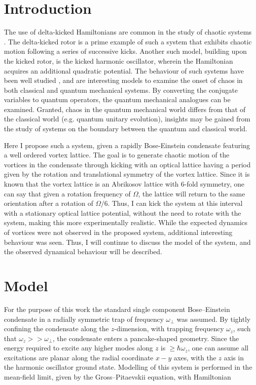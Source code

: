 \section{Introduction}

The use of delta-kicked Hamiltonians are common in the study of chaotic systems \cite{CT:Ullah_epjd_2012,CT:White_njp_2014}. The delta-kicked rotor is a prime example of such a system that exhibits chaotic motion following a series of successive kicks. Another such model, building upon the kicked rotor, is the kicked harmonic oscillator, wherein the Hamiltonian acquires an additional quadratic potential. The behaviour of such systems have been well studied \cite{CT:Berman_nonlin_1991, CT:Duffy_pra_2004}, and are interesting models to examine the onset of chaos in both classical and quantum mechanical systems. By converting the conjugate variables to quantum operators, the quantum mechanical analogues can be examined. Granted, chaos in the quantum mechanical world differs from that of the classical world (e.g. quantum unitary evolution), insights may be gained from the study of systems on the boundary between the quantum and classical world.

Here I propose such a system, given a rapidly Bose-Einstein condensate featuring a well ordered vortex lattice. The goal is to generate chaotic motion of the vortices in the condensate through kicking with an optical lattice having a period given by the rotation and translational symmetry of the vortex lattice. Since it is known that the vortex lattice is an Abrikosov lattice with 6-fold symmetry, one can say that given a rotation frequency of $\Omega$, the lattice will return to the same orientation after a rotation of $\Omega/6$. Thus, I can kick the system at this interval with a stationary optical lattice potential, without the need to rotate with the system, making this more experimentally realistic. While the expected dynamics of vortices were not observed in the proposed system, additional interesting behaviour was seen. Thus, I will continue to discuss the model of the system, and the observed dynamical behaviour will be described.

\section{Model}
For the purpose of this work the standard single component Bose--Einstein condensate in a radially symmetric trap of frequency $\omega_\perp$ was assumed. By tightly confining the condensate along the $z$-dimension, with trapping frequency $\omega_z$, such that $\omega_z >> \omega_\perp$, the condensate enters a pancake-shaped geometry. Since the energy required to excite any higher modes along $z$ is $\geq \hbar\omega_z$, one can assume all excitations are planar along the radial coordinate $x-y$ axes, with the $z$ axis in the harmonic oscillator ground state. Modelling of this system is performed in the mean-field limit, given by the Gross--Pitaevskii equation, with Hamiltonian

